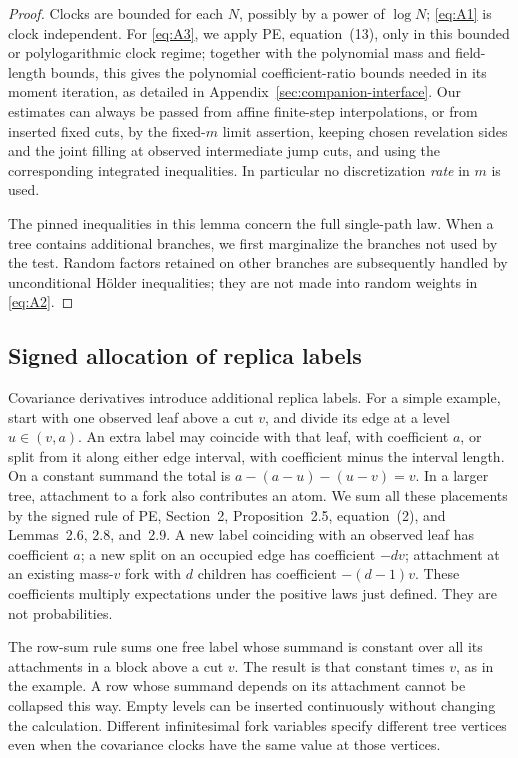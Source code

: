 \begin{proof}
Clocks are bounded for each \(N\), possibly by a power of \(\log N\); \eqref{eq:A1} is clock independent. For \eqref{eq:A3}, we apply PE, equation~(13), only in this bounded or polylogarithmic clock regime; together with the polynomial mass and field-length bounds, this gives the polynomial coefficient-ratio bounds needed in its moment iteration, as detailed in Appendix~\ref{sec:companion-interface}. Our estimates can always be passed from affine finite-step interpolations, or from inserted fixed cuts, by the fixed-\(m\) limit assertion, keeping chosen revelation sides and the joint filling at observed intermediate jump cuts, and using the corresponding integrated inequalities. In particular no discretization \emph{rate} in \(m\) is used.

The pinned inequalities in this lemma concern the full single-path law. When a tree contains additional branches, we first marginalize the branches not used by the test. Random factors retained on other branches are subsequently handled by unconditional H\"older inequalities; they are not made into random weights in \eqref{eq:A2}.
\end{proof}

\subsection{Signed allocation of replica labels}

Covariance derivatives introduce additional replica labels. For a simple
example, start with one observed leaf above a cut \(v\), and divide its
edge at a level \(u\in(v,a)\). An extra label may coincide with that
leaf, with coefficient \(a\), or split from it along either edge
interval, with coefficient minus the interval length. On a constant
summand the total is \(a-(a-u)-(u-v)=v\). In a larger tree, attachment
to a fork also contributes an atom. We sum all these placements by the
signed rule of PE, Section~2,
Proposition~2.5, equation~(2), and Lemmas~2.6, 2.8, and~2.9. A new
label coinciding with an observed leaf has coefficient \(a\); a new
split on an occupied edge has coefficient \(-dv\); attachment at an
existing mass-\(v\) fork with \(d\) children has coefficient
\(-(d-1)v\). These coefficients multiply expectations under the
positive laws just defined. They are not probabilities.

The row-sum rule sums one free label whose summand is constant over all
its attachments in a block above a cut \(v\). The result is that constant
times \(v\), as in the example. A row whose summand depends
on its attachment cannot be collapsed this way. Empty levels can be
inserted continuously without changing the calculation. Different
infinitesimal fork variables specify different tree vertices even when
the covariance clocks have the same value at those vertices.

